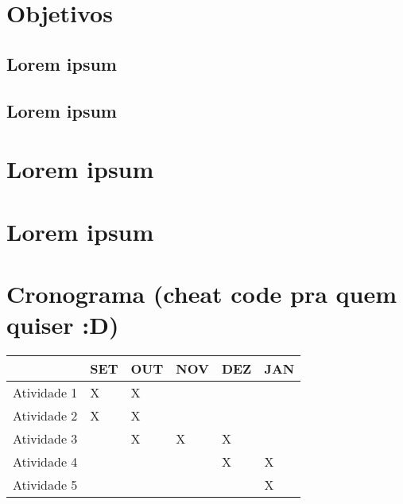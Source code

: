 \documentclass[projtg]{mdtufsm}
\begin{document}
\chapter{Objetivos}
\lipsum[1]

\section{Lorem ipsum}
\lipsum[1]
	
\section{Lorem ipsum}
\lipsum[1]

\chapter{Lorem ipsum}
\lipsum[1]

\chapter{Lorem ipsum}
\lipsum[1]
    
\chapter{Cronograma (cheat code pra quem quiser :D)}
\begin{tabu} to 0.9\linewidth{|X[6]|X|X|X|X|X|}
	\hline
	& SET & OUT & NOV & DEZ & JAN \\
	\hline
	Atividade 1 & X & X & & & \\
	\hline
	Atividade 2 & X & X & & & \\
	\hline
	Atividade 3 & & X & X & X & \\
	\hline
	Atividade 4 & & & & X & X \\
	\hline
	Atividade 5 & & & & & X \\
	\hline
\end{tabu}
 
\setlength{\baselineskip}{\baselineskip}



\end{document}

